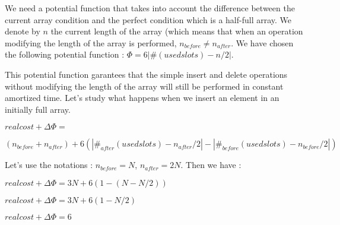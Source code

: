 We need a potential function that takes into account the difference between the current array condition and the perfect condition which is a half-full array. We denote by $n$ the current length of the array (which means that when an operation modifying the length of the array is performed, $n_{before} \neq n_{after}$. We have chosen the following potential function : $\Phi = 6 |\# (used slots) - n/2|$.

This potential function garantees that the simple insert and delete operations without modifying the length of the array will still be performed in constant amortized time. Let's study what happens when we insert an element in an initially full array.

$real cost + \Delta\Phi =$

$ (n_{before} + n_{after}) +6(|\#_{after} (used slots)-n_{after}/2|-|\#_{before} (used slots)-n_{before}/2|)$

Let's use the notations : $n_{before} = N$, $n_{after} = 2N$. Then we have :

$real cost + \Delta\Phi = 3N +6(1-(N-N/2))$

$real cost + \Delta\Phi = 3N +6(1-N/2)$

$real cost + \Delta\Phi = 6$